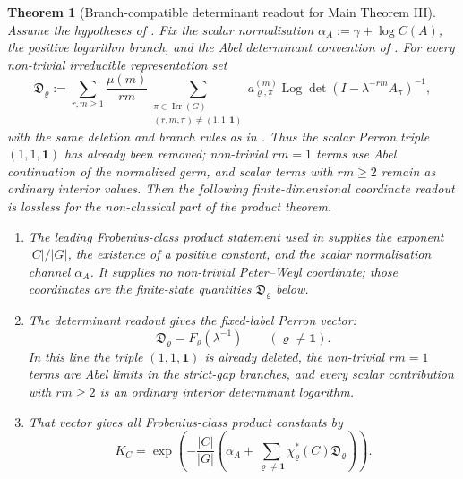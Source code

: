 \documentclass[11pt,a4paper]{amsart}
\theoremstyle{plain}
\newtheorem{theorem}{Theorem}[section]
\theoremstyle{definition}
\theoremstyle{remark}
\DeclareMathOperator{\Irr}{Irr}
\DeclareMathOperator{\Log}{Log}
\begin{document}
\begin{theorem}[Branch-compatible determinant readout for Main Theorem III]
  \label{thm:main-iii-certificate-chain}
  Assume the hypotheses of .  Fix the scalar
  normalisation \(\alpha_A:=\gamma+\log C(A)\), the positive logarithm branch,
  and the Abel determinant convention of
  .  For every non-trivial
  irreducible representation set
  \[
    \mathfrak D_\varrho
    :=
    \sum_{r,m\ge1}\frac{\mu(m)}{rm}
      \sum_{\substack{\pi\in\Irr(G)\\(r,m,\pi)\neq(1,1,\mathbf1)}}
        a_{\varrho,\pi}^{(m)}
        \Log\det(I-\lambda^{-rm}A_\pi)^{-1},
  \]
  with the same deletion and branch rules as in
  .  Thus the scalar Perron triple
  \((1,1,\mathbf1)\) has already been removed; non-trivial \(rm=1\) terms use
  Abel continuation of the normalized germ, and scalar terms with \(rm\ge2\)
  remain as ordinary interior values.  Then the following finite-dimensional coordinate readout is lossless for the
  non-classical part of the product theorem.
  \begin{enumerate}[label=\textup{(\alph*)},leftmargin=*]
    \item The leading Frobenius-class product statement used in
     supplies
    the exponent \(|C|/|G|\), the existence of a positive constant, and the
    scalar normalisation channel \(\alpha_A\).  It supplies no non-trivial
    Peter--Weyl coordinate; those coordinates are the finite-state quantities
    \(\mathfrak D_\varrho\) below.
    \item The determinant readout gives the fixed-label Perron vector:
    \[
      \mathfrak D_\varrho=F_\varrho(\lambda^{-1})
      \qquad(\varrho\neq\mathbf1).
    \]
    In this line the triple \((1,1,\mathbf1)\) is already deleted, the
    non-trivial \(rm=1\) terms are Abel limits in the strict-gap branches, and
    every scalar contribution with \(rm\ge2\) is an ordinary interior
    determinant logarithm.
    \item That vector gives all Frobenius-class product constants by
    \begin{equation}\label{eq:main-iii-certificate-k-readout}
      K_C=
      \exp\!\left(
        -\frac{|C|}{|G|}
        \left(
          \alpha_A+
          \sum_{\varrho\neq\mathbf1}
            \chi_\varrho^\ast(C)\mathfrak D_\varrho
        \right)
      \right).
    \end{equation}

\end{enumerate}
\end{theorem}
\end{document}
